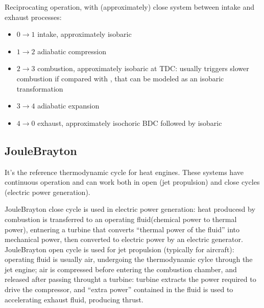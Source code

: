 \documentclass[letterpaper,10pt,english]{jupyterBook}
\begin{document}
\sphinxAtStartPar
{}

\sphinxAtStartPar
{} Reciprocating operation, with (approximately\sphinxfootnotemark[1]) close system between intake and exhaust processes:
\begin{itemize}
\item {} 
\sphinxAtStartPar
\(0 \rightarrow 1\) intake, approximately isobaric

\item {} 
\sphinxAtStartPar
\(1 \rightarrow 2\) adiabatic compression

\item {} 
\sphinxAtStartPar
\(2 \rightarrow 3\) combustion, approximately isobaric at TDC:  usually triggers slower combustion if compared with {\hyperref[\detokenize{ch/heat-engines:classical-thermodynamics-heat-engines-real-otto}]{}}, that can be modeled as an isobaric transformation

\item {} 
\sphinxAtStartPar
\(3 \rightarrow 4\) adiabatic expansion

\item {} 
\sphinxAtStartPar
\(4 \rightarrow 0\) exhaust, approximately isochoric BDC followed by isobaric

\end{itemize}


\subsection{Joule\sphinxhyphen{}Brayton}
\label{\detokenize{ch/heat-engines:joule-brayton}}\label{\detokenize{ch/heat-engines:classical-thermodynamics-heat-engines-real-joule-brayton}}
\sphinxAtStartPar
{} It’s the reference thermodynamic cycle for  heat engines. These systems have continuous operation and can work both in open (jet propulsion) and close cycles (electric power generation).

\sphinxAtStartPar
{} Joule\sphinxhyphen{}Brayton close cycle is used in electric power generation: heat producesd by combustion is transferred to an operating fluid(chemical power to thermal power), entnering a turbine that converts “thermal power of the fluid” into mechanical power, then converted to electric power by an electric generator. Joule\sphinxhyphen{}Brayton open cycle is used for jet propulsion (typically for aircraft): operating fluid is usually air, undergoing the thermodynamic cylce through the jet engine; air is compressed before entering the combustion chamber, and released after passing throught a turbine: turbine extracts the power required to drive the compressor, and “extra power” contained in the fluid is used to accelerating exhaust fluid, producing thrust.
\end{document}
